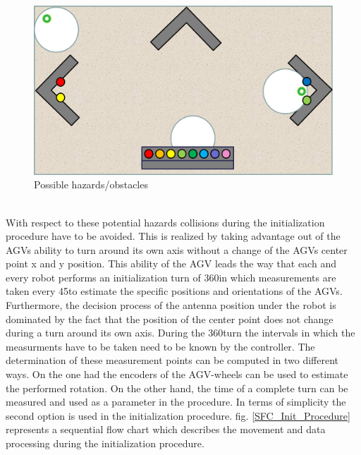 \begin{figure}[!htbp]
\centering
\includegraphics[width = 16cm]{Pictures/hazards}
\caption{Possible hazards/obstacles}
\label{hazards}
\end{figure}\\
With respect to these potential hazards collisions during the initialization procedure have to be avoided. This is realized by taking advantage out of the AGVs ability to turn around its own axis without a change of the AGVs center point x and y position. This ability of the AGV leads the way that each and every robot performs an initialization turn of 360\textdegree  in which measurements are taken every 45\textdegree  to estimate the specific positions and orientations of the AGVs. Furthermore, the decision process of the antenna position under the robot is dominated by the fact that the position of the center point does not change during a turn around its own axis. 
During the 360\textdegree  turn the intervals in which the measurments have to be taken need to be known by the controller. The determination of these measurement points can be computed in two different ways. On the one had the encoders of the AGV-wheels can be used to estimate the performed rotation. On the other hand, the time of a complete turn can be measured and used as a parameter in the procedure. In terms of simplicity the second option is used in the initialization procedure.  
fig. \ref{SFC_Init_Procedure} represents a sequential flow chart which describes the movement and data processing during the initialization procedure.\\ 
